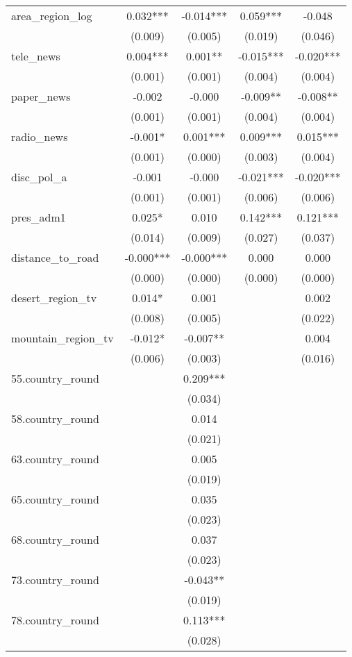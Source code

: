 \documentclass[]{article}
\begin{document}
\begin{tabular}{lcccc}
area\_region\_log & 0.032*** & -0.014*** & 0.059*** & -0.048 \\
 & (0.009) & (0.005) & (0.019) & (0.046) \\
tele\_news & 0.004*** & 0.001** & -0.015*** & -0.020*** \\
 & (0.001) & (0.001) & (0.004) & (0.004) \\
paper\_news & -0.002 & -0.000 & -0.009** & -0.008** \\
 & (0.001) & (0.001) & (0.004) & (0.004) \\
radio\_news & -0.001* & 0.001*** & 0.009*** & 0.015*** \\
 & (0.001) & (0.000) & (0.003) & (0.004) \\
disc\_pol\_a & -0.001 & -0.000 & -0.021*** & -0.020*** \\
 & (0.001) & (0.001) & (0.006) & (0.006) \\
pres\_adm1 & 0.025* & 0.010 & 0.142*** & 0.121*** \\
 & (0.014) & (0.009) & (0.027) & (0.037) \\
distance\_to\_road & -0.000*** & -0.000*** & 0.000 & 0.000 \\
 & (0.000) & (0.000) & (0.000) & (0.000) \\
desert\_region\_tv & 0.014* & 0.001 &  & 0.002 \\
 & (0.008) & (0.005) &  & (0.022) \\
mountain\_region\_tv & -0.012* & -0.007** &  & 0.004 \\
 & (0.006) & (0.003) &  & (0.016) \\
55.country\_round &  & 0.209*** &  &  \\
 &  & (0.034) &  &  \\
58.country\_round &  & 0.014 &  &  \\
 &  & (0.021) &  &  \\
63.country\_round &  & 0.005 &  &  \\
 &  & (0.019) &  &  \\
65.country\_round &  & 0.035 &  &  \\
 &  & (0.023) &  &  \\
68.country\_round &  & 0.037 &  &  \\
 &  & (0.023) &  &  \\
73.country\_round &  & -0.043** &  &  \\
 &  & (0.019) &  &  \\
78.country\_round &  & 0.113*** &  &  \\
 &  & (0.028) &  &  \\

\end{tabular}
\end{document}
